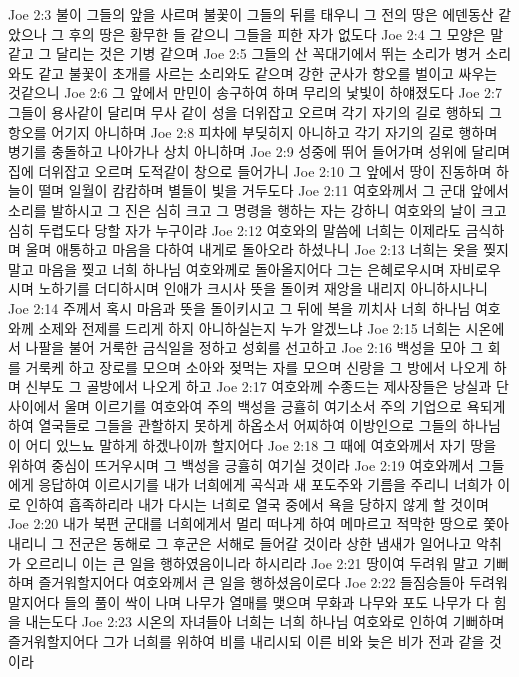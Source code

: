 Joe 2:3  불이 그들의 앞을 사르며 불꽃이 그들의 뒤를 태우니 그 전의 땅은 에덴동산 같았으나 그 후의 땅은 황무한 들 같으니 그들을 피한 자가 없도다
Joe 2:4  그 모양은 말 같고 그 달리는 것은 기병 같으며
Joe 2:5  그들의 산 꼭대기에서 뛰는 소리가 병거 소리와도 같고 불꽃이 초개를 사르는 소리와도 같으며 강한 군사가 항오를 벌이고 싸우는 것같으니
Joe 2:6  그 앞에서 만민이 송구하여 하며 무리의 낯빛이 하얘졌도다
Joe 2:7  그들이 용사같이 달리며 무사 같이 성을 더위잡고 오르며 각기 자기의 길로 행하되 그 항오를 어기지 아니하며
Joe 2:8  피차에 부딪히지 아니하고 각기 자기의 길로 행하며 병기를 충돌하고 나아가나 상치 아니하며
Joe 2:9  성중에 뛰어 들어가며 성위에 달리며 집에 더위잡고 오르며 도적같이 창으로 들어가니
Joe 2:10  그 앞에서 땅이 진동하며 하늘이 떨며 일월이 캄캄하며 별들이 빛을 거두도다
Joe 2:11  여호와께서 그 군대 앞에서 소리를 발하시고 그 진은 심히 크고 그 명령을 행하는 자는 강하니 여호와의 날이 크고 심히 두렵도다 당할 자가 누구이랴
Joe 2:12  여호와의 말씀에 너희는 이제라도 금식하며 울며 애통하고 마음을 다하여 내게로 돌아오라 하셨나니
Joe 2:13  너희는 옷을 찢지 말고 마음을 찢고 너희 하나님 여호와께로 돌아올지어다 그는 은혜로우시며 자비로우시며 노하기를 더디하시며 인애가 크시사 뜻을 돌이켜 재앙을 내리지 아니하시나니
Joe 2:14  주께서 혹시 마음과 뜻을 돌이키시고 그 뒤에 복을 끼치사 너희 하나님 여호와께 소제와 전제를 드리게 하지 아니하실는지 누가 알겠느냐
Joe 2:15  너희는 시온에서 나팔을 불어 거룩한 금식일을 정하고 성회를 선고하고
Joe 2:16  백성을 모아 그 회를 거룩케 하고 장로를 모으며 소아와 젖먹는 자를 모으며 신랑을 그 방에서 나오게 하며 신부도 그 골방에서 나오게 하고
Joe 2:17  여호와께 수종드는 제사장들은 낭실과 단 사이에서 울며 이르기를 여호와여 주의 백성을 긍휼히 여기소서 주의 기업으로 욕되게하여 열국들로 그들을 관할하지 못하게 하옵소서 어찌하여 이방인으로 그들의 하나님이 어디 있느뇨 말하게 하겠나이까 할지어다
Joe 2:18  그 때에 여호와께서 자기 땅을 위하여 중심이 뜨거우시며 그 백성을 긍휼히 여기실 것이라
Joe 2:19  여호와께서 그들에게 응답하여 이르시기를 내가 너희에게 곡식과 새 포도주와 기름을 주리니 너희가 이로 인하여 흡족하리라 내가 다시는 너희로 열국 중에서 욕을 당하지 않게 할 것이며
Joe 2:20  내가 북편 군대를 너희에게서 멀리 떠나게 하여 메마르고 적막한 땅으로 쫓아내리니 그 전군은 동해로 그 후군은 서해로 들어갈 것이라 상한 냄새가 일어나고 악취가 오르리니 이는 큰 일을 행하였음이니라 하시리라
Joe 2:21  땅이여 두려워 말고 기뻐하며 즐거워할지어다 여호와께서 큰 일을 행하셨음이로다
Joe 2:22  들짐승들아 두려워 말지어다 들의 풀이 싹이 나며 나무가 열매를 맺으며 무화과 나무와 포도 나무가 다 힘을 내는도다
Joe 2:23  시온의 자녀들아 너희는 너희 하나님 여호와로 인하여 기뻐하며 즐거워할지어다 그가 너희를 위하여 비를 내리시되 이른 비와 늦은 비가 전과 같을 것이라
